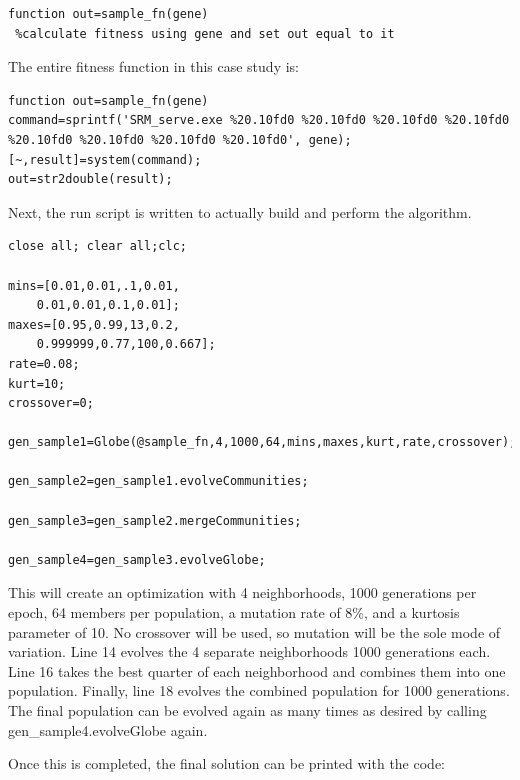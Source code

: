 \documentclass[conference]{IEEEtran}
\begin{document}
\begin{minipage}{0.43\textwidth}
\begin{lstlisting}
function out=sample_fn(gene)
 %calculate fitness using gene and set out equal to it
\end{lstlisting}
\end{minipage}

The entire fitness function in this case study is:

\begin{minipage}{0.43\textwidth}
\begin{lstlisting}
function out=sample_fn(gene)
command=sprintf('SRM_serve.exe %20.10fd0 %20.10fd0 %20.10fd0 %20.10fd0 %20.10fd0 %20.10fd0 %20.10fd0 %20.10fd0', gene);
[~,result]=system(command);
out=str2double(result);
\end{lstlisting}
\end{minipage}

Next, the run script is written to actually build and perform the algorithm.

\begin{minipage}{0.43\textwidth}
\begin{lstlisting}
close all; clear all;clc;

mins=[0.01,0.01,.1,0.01,
	0.01,0.01,0.1,0.01];
maxes=[0.95,0.99,13,0.2,
	0.999999,0.77,100,0.667];
rate=0.08;
kurt=10;
crossover=0;

gen_sample1=Globe(@sample_fn,4,1000,64,mins,maxes,kurt,rate,crossover);

gen_sample2=gen_sample1.evolveCommunities;

gen_sample3=gen_sample2.mergeCommunities;

gen_sample4=gen_sample3.evolveGlobe;
\end{lstlisting}
\end{minipage}

This will create an optimization with 4 neighborhoods, 1000 generations per epoch, 64 members per population, a mutation rate of 8\%, and a kurtosis parameter of 10.  No crossover will be used, so mutation will be the sole mode of variation.  Line 14 evolves the 4 separate neighborhoods 1000 generations each.  Line 16 takes the best quarter of each neighborhood and combines them into one population.  Finally, line 18 evolves the combined population for 1000 generations.  The final population can be evolved again as many times as desired by calling gen\_sample4.evolveGlobe again. 

Once this is completed, the final solution can be printed with the code:
\end{document}
